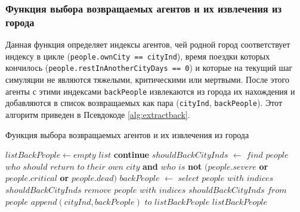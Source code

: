 \documentclass[a4paper,12pt]{article} %
\begin{document}
\subsubsection{Функция выбора возвращаемых агентов и их извлечения из города}

Данная функция определяет индексы агентов, чей родной город соответствует индексу в цикле (\texttt{people.ownCity == cityInd}), время поездки которых кончилось (\texttt{people.restInAnotherCityDays == 0}) и которые на текущий шаг симуляции не являются тяжелыми, критическими или мертвыми. После этого агенты с этими индексами \texttt{backPeople} извлекаются из города их нахождения и добавляются в список возвращаемых как пара (\texttt{cityInd}, \texttt{backPeople}). Этот алгоритм приведен в Псевдокоде \ref{alg:extractback}.

\begin{algorithm}[h]
\caption{Функция выбора возвращаемых агентов и их извлечения из города}
\label{alg:extractback}
\begin{algorithmic}[1]
	\State \(listBackPeople \gets empty \) \(list\)
			\State \textbf{continue}
		\EndIf
		\State \(shouldBackCityInds\) \(\gets\) \(find\) \(people\) \(who\) \(should\) \(return\) \(to\) \(their\) \(own\) \(city\) \textbf{and} \(who\) \(is\) \textbf{not} \( (people.severe \) \textbf{or} \( people.critical \) \textbf{or} \( people.dead) \)
		\State \(backPeople\) \(\gets\) \(select\) \(people\) \(with\) \(indices\) \(shouldBackCityInds\)
		\State \(remove\) \(people\) \(with\) \(indices\) \(shouldBackCityInds\) \(from\) \(people\)
		\State \(append(cityInd, backPeople)\) \(to\) \(listBackPeople\)
	\EndFor
	\State \Return \(listBackPeople\)
\EndFunction 
\end{algorithmic}
\end{algorithm}






\end{document}

